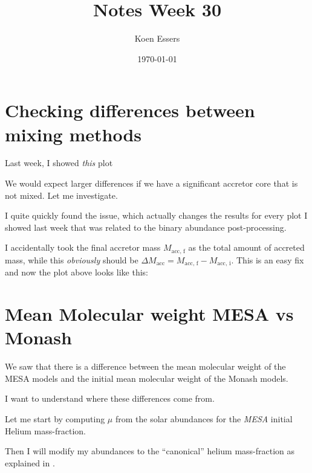 \documentclass[a4paper,10pt]{article}
\title{Notes Week 30}
\author{Koen Essers}
\date{\today}
\begin{document}
\setuplayout
\section{Checking differences between mixing methods}

Last week, I showed \emph{this} plot

\begin{figure}[ht]
	\centering
\end{figure}

We would expect larger differences if we have a significant accretor core that is not mixed.
Let me investigate.

I quite quickly found the issue, which actually changes the results for every plot I showed last week that
was related to the binary abundance post-processing.

I accidentally took the final accretor mass \(M_\text{acc, f}\) as the total amount of accreted mass,
while this \emph{obviously} should be \(\Delta M_\text{acc} = M_\text{acc, f} - M_\text{acc, i}\).
This is an easy fix and now the plot above looks like this:

\begin{figure}[ht]
	\centering
\end{figure}

\section{Mean Molecular weight MESA vs Monash}

We saw that there is a difference between the mean molecular weight of the MESA
models and the initial mean molecular weight of the Monash models.

I want to understand where these differences come from.

Let me start by computing \(\mu \) from the \citet{asplund2009} solar abundances for the \emph{MESA} initial
Helium mass-fraction.

Then I will modify my \citet{asplund2009} abundances to the ``canonical'' helium mass-fraction as explained
in \citet{karakas2014}.

\begin{figure}[ht]
	\centering
\end{figure}
\end{document}
